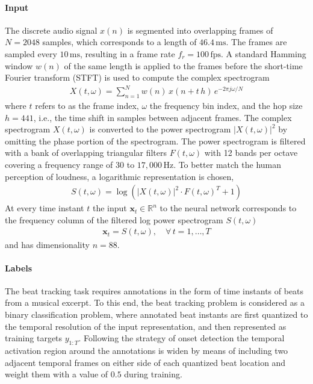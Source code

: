 \documentclass{scrartcl}
\begin{document}
\paragraph{Input}

The discrete audio signal $x(n)$ is segmented into overlapping frames of $N = 2048$ samples, which corresponds to a length of $46.4 \,\text{ms}$. The frames are sampled every $10 \,\text{ms}$, resulting in a frame rate $f_r = 100 \,\text{fps}$. A standard Hamming window $w(n)$ of the same length is applied to the frames before the short-time Fourier transform (STFT) is used to compute the complex spectrogram 
\begin{align}
X(t,\omega) = \sum_{n = 1}^{N} w(n) \, x(n + t\,h) \, e^{-2 \pi j \omega /N}
\end{align} 
where $t$ refers to as the frame index, $\omega$ the frequency bin index, and the hop size $h=441$, i.e., the time shift in samples between adjacent frames. The complex spectrogram $X(t,\omega)$ is converted to the power spectrogram $|X(t,\omega)|^2$ by omitting the phase portion of the spectrogram. The power spectrogram is filtered with a bank of overlapping triangular filters $F(t,\omega)$ with 12 bands per octave covering a frequency range of $30$ to $17,000 \, \text{Hz}$. To better match the human perception of loudness, a logarithmic representation is chosen, 
\begin{align}
S(t,\omega) = \log \left( |X(t,\omega)|^2 \cdot F(t,\omega)^T + 1 \right)
\end{align} 
At every time instant $t$ the input  $\mathbf x_t \in \mathbb R^n$ to the neural network corresponds to the frequency column of the filtered log power spectrogram $S(t,\omega)$
\begin{align}
\mathbf x_t = S(t,\omega), \quad \forall\, t= 1,\dots,T
\end{align} 
and has dimensionality $n=88$.


\paragraph{Labels}
The beat tracking task requires annotations in the form of time instants of beats from a musical excerpt. To this end, the beat tracking problem is considered as a binary classification problem, where annotated beat instants are first quantized to the temporal resolution of the input representation, and then represented as training targets $y_{1:T}$. Following the strategy of onset detection \cite{Schluter2014} the temporal activation region around the annotations is widen by means of including two adjacent temporal frames on either side of each quantized beat location and weight them with a value of $0.5$ during training. 
\end{document}
